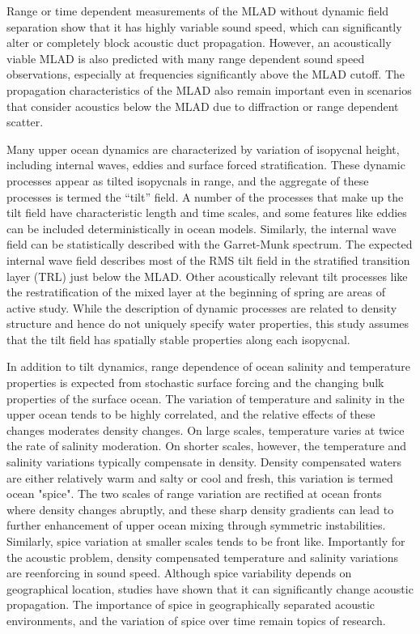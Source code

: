 \documentclass[preprint,NumberedRefs]{JASA}
\begin{document}
Range or time dependent measurements of the MLAD without dynamic field separation show that it has highly variable sound speed\citep{cole2010seasonal,rudnick1999compensation,klymak2015}, which can significantly alter or completely block acoustic duct propagation\citep{colosi2020observations,colosi21}. However, an acoustically viable MLAD is also predicted with many range dependent sound speed observations, especially at frequencies significantly above the MLAD cutoff. The propagation characteristics of the MLAD also remain important even in scenarios that consider acoustics below the MLAD due to diffraction or range dependent scatter\citep{colosi21}.

Many upper ocean dynamics are characterized by variation of isopycnal height, including internal waves, eddies and surface forced stratification. These dynamic processes appear as tilted isopycnals in range, and the aggregate of these processes is termed the ``tilt'' field\cite{dzieciuch2004}. A number of the processes that make up the tilt field have characteristic length and time scales, and some features like eddies can be included deterministically in ocean models. Similarly, the internal wave field can be statistically described with the Garret-Munk spectrum\cite{garrett1972space}. The expected internal wave field describes most of the RMS tilt field in the stratified transition layer (TRL) just below the MLAD. Other acoustically relevant tilt processes like the restratification of the mixed layer at the beginning of spring are areas of active study\cite{cole2010seasonal}. While the description of dynamic processes are related to density structure and hence do not uniquely specify water properties, this study assumes that the tilt field has spatially stable properties along each isopycnal.

In addition to tilt dynamics, range dependence of ocean salinity and temperature properties is expected from stochastic surface forcing and the changing bulk properties of the surface ocean\citep{ferrari2000}. The variation of temperature and salinity in the upper ocean tends to be highly correlated, and the relative effects of these changes moderates density changes. On large scales, temperature varies at twice the rate of salinity moderation. On shorter scales, however, the temperature and salinity variations typically compensate in density. Density compensated waters are either relatively warm and salty or cool and fresh, this variation is termed ocean "spice"\citep{munk1981evolution}. The two scales of range variation are rectified at ocean fronts where density changes abruptly, and these sharp density gradients can lead to further enhancement of upper ocean mixing through symmetric instabilities\citep{dasaro2011}. Similarly, spice variation at smaller scales tends to be front like\cite{rudnick1999compensation}. Importantly for the acoustic problem, density compensated temperature and salinity variations are reenforcing in sound speed. Although spice variability depends on geographical location, studies have shown that it can significantly change acoustic propagation\citep{colosi12,colosi13,murat2021}. The importance of spice in geographically separated acoustic environments, and the variation of spice over time remain topics of research.
\end{document}
